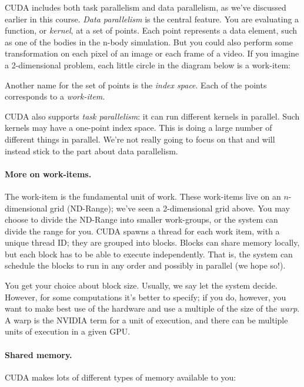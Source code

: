 \documentclass[a4paper]{report}
\begin{document}
CUDA includes both task parallelism and data parallelism, as we've
discussed earlier in this course. \emph{Data parallelism} is the central
feature. You are evaluating a function, or \emph{kernel},
at a set of points. Each point represents a data element, such as one of the
bodies in the n-body simulation. But you could also perform some 
transformation on each pixel of an image or each frame of a video. If you 
imagine a 2-dimensional problem, each little circle in the diagram below is
a work-item:

\begin{center}
\end{center}

Another name for the set of points is the \emph{index space}. 
Each of the points corresponds to a \emph{work-item}.

CUDA also supports \emph{task parallelism}: it can run different
kernels in parallel. Such kernels may have a one-point index space. This is
doing a large number of different things in parallel. We're not really going
to focus on that and will instead stick to the part about data parallelism.

\paragraph{More on work-items.} The work-item is the fundamental
unit of work. These work-items live on an $n$-dimensional
grid (ND-Range); we've seen a 2-dimensional grid above. You may choose
to divide the ND-Range into smaller work-groups, or the system can
divide the range for you. CUDA spawns a thread for each work item,
with a unique thread ID; they are grouped into blocks. Blocks can share 
memory locally, but each block has to be able to execute independently.
That is, the system can schedule the blocks to run in any order and possibly
in parallel (we hope so!). 

You get your choice about block size. Usually, we say let the system decide. However, for some computations it's better to specify; if you do, however, you want to make best use of the hardware and use a multiple of the size of the \textit{warp}. A warp is the NVIDIA term for a unit of execution, and there can be multiple units of execution in a given GPU.

\paragraph{Shared memory.} CUDA makes lots of different types of
memory available to you:
\end{document}
